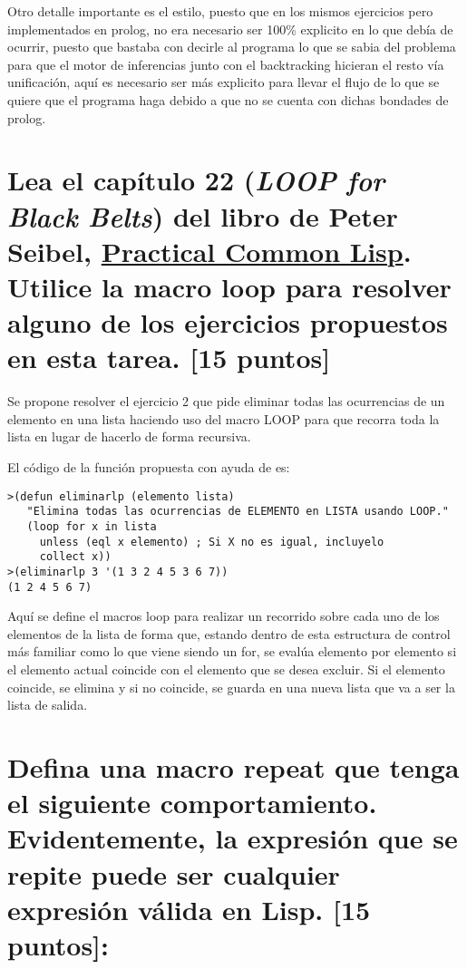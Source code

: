 \documentclass[11pt, letterpaper]{article}
\begin{document}
Otro detalle importante es el estilo, puesto que en los mismos ejercicios pero implementados en prolog, no era necesario ser 100\% explicito en lo que debía de ocurrir, puesto que bastaba con decirle al programa lo que se sabia del problema para que el motor de inferencias junto con el backtracking hicieran el resto vía unificación, aquí es necesario ser más explicito para llevar el flujo de lo que se quiere que el programa haga debido a que no se cuenta con dichas bondades de prolog.

\newpage
 
\section{Lea el capítulo 22 (\textit{LOOP for Black Belts}) del libro de Peter Seibel, \href{https://gigamonkeys.com/book/}{Practical Common Lisp}. Utilice la macro loop para resolver alguno de los ejercicios propuestos en esta tarea. [15 puntos]}

Se propone resolver el ejercicio 2 que pide eliminar todas las ocurrencias de un elemento en una lista haciendo uso del macro LOOP para que recorra toda la lista en lugar de hacerlo de forma recursiva.

El código de la función propuesta con ayuda de \cite{seibel2006} es:

\begin{itemize}
	\begin{verbatim}
>(defun eliminarlp (elemento lista)
   "Elimina todas las ocurrencias de ELEMENTO en LISTA usando LOOP."
   (loop for x in lista
     unless (eql x elemento) ; Si X no es igual, incluyelo
     collect x))
>(eliminarlp 3 '(1 3 2 4 5 3 6 7))
(1 2 4 5 6 7)
	\end{verbatim}
\end{itemize}

Aquí se define el macros loop para realizar un recorrido sobre cada uno de los elementos de la lista de forma que, estando dentro de esta estructura de control más familiar como lo que viene siendo un for, se evalúa elemento por elemento si el elemento actual coincide con el elemento que se desea excluir. Si el elemento coincide, se elimina y si no coincide, se guarda en una nueva lista que va a ser la lista de salida.

\newpage

\section{Defina una macro repeat que tenga el siguiente comportamiento. Evidentemente, la expresión que se repite puede ser cualquier expresión válida en Lisp. [15 puntos]:}
\end{document}
